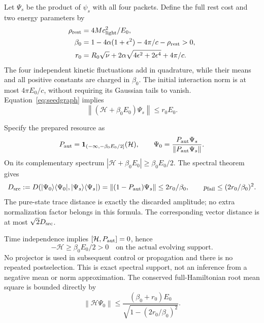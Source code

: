 \documentclass[11pt]{article}
\newcommand{\Hil}{\mathcal H}
\newcommand{\Id}{\mathbf 1}
\newcommand{\norm}[1]{\left\lVert#1\right\rVert}
\begin{document}
Let $\Psi_s$ be the product of $\psi_s$ with all four packets.
Define the full rest cost and two energy parameters by
\begin{align}
 \rho_{\rm rest}&=4Mc_{\rm light}^2/E_0,\nonumber\\
 \beta_0&=1-4\alpha(1+\epsilon^2)-4\pi/c-\rho_{\rm rest}>0,\label{eq:beta}\\
 r_0&=R_0\sqrt\nu+2\alpha\sqrt{4\epsilon^2+2\epsilon^4}+4\pi/c.\label{eq:r}
\end{align}
The four independent kinetic fluctuations add in quadrature, while their means and all positive constants are charged in $\beta_0$.
The initial interaction norm is at most $4\pi E_0/c$, without requiring its Gaussian tails to vanish.
Equation~\eqref{eq:seedgraph} implies
\begin{equation}
 \norm{(\Hil+\beta_0E_0)\Psi_s}\le r_0E_0.\label{eq:totalgraph}
\end{equation}

Specify the prepared resource as
\begin{equation}
 P_{\rm aut}=\Id_{(-\infty,-\beta_0E_0/2]}(\Hil),\qquad
 \Psi_0=\frac{P_{\rm aut}\Psi_s}{\norm{P_{\rm aut}\Psi_s}}.\label{eq:filter}
\end{equation}
On its complementary spectrum $|\Hil+\beta_0E_0|\ge\beta_0E_0/2$.
The spectral theorem gives
\begin{equation}
 D_{\rm src}:=D(|\Psi_0\rangle\langle\Psi_0|,|\Psi_s\rangle\langle\Psi_s|)
 =\norm{(1-P_{\rm aut})\Psi_s}\le2r_0/\beta_0,
 \qquad p_{\rm fail}\le(2r_0/\beta_0)^2.\label{eq:sourcebound}
\end{equation}
The pure-state trace distance is exactly the discarded amplitude; no extra normalization factor belongs in this formula.
The corresponding vector distance is at most $\sqrt2D_{\rm src}$.

Time independence implies $[\Hil,P_{\rm aut}]=0$, hence
\begin{equation}
 -\Hil\ge\beta_0E_0/2>0\quad\text{on the actual evolving support}.\label{eq:dustgap}
\end{equation}
No projector is used in subsequent control or propagation and there is no repeated postselection.
This is exact spectral support, not an inference from a negative mean or norm approximation.
The conserved full-Hamiltonian root mean square is bounded directly by
\begin{equation}
 \norm{\Hil\Psi_0}\le
 \frac{(\beta_0+r_0)E_0}{\sqrt{1-(2r_0/\beta_0)^2}}.\label{eq:fullrms}
\end{equation}
\end{document}
